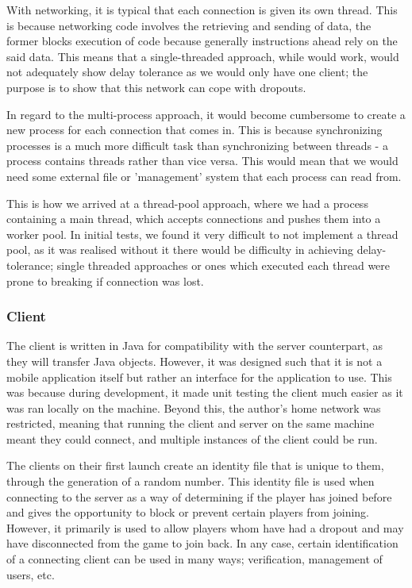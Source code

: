 \documentclass[11pt]{article}
\begin{document}
With networking, it is typical that each connection is given its own thread. This is because networking code involves the retrieving and sending of data, the former blocks execution of code because generally instructions ahead rely on the said data. This means that a single-threaded approach, while would work, would not adequately show delay tolerance as we would only have one client; the purpose is to show that this network can cope with dropouts.

In regard to the multi-process approach, it would become cumbersome to create a new process for each connection that comes in. This is because synchronizing processes is a much more difficult task than synchronizing between threads - a process contains threads rather than vice versa. This would mean that we would need some external file or 'management' system that each process can read from. 


This is how we arrived at a thread-pool approach, where we had a process containing a main thread, which accepts connections and pushes them into a worker pool. In initial tests, we found it very difficult to not implement a thread pool, as it was realised without it there would be difficulty in achieving delay-tolerance; single threaded approaches or ones which executed each thread were prone to breaking if connection was lost. 






\subsubsection{Client}

The client is written in Java for compatibility with the server counterpart, as they will transfer Java objects. However, it was designed such that it is not a mobile application itself but rather an interface for the application to use. This was because during development, it made unit testing the client much easier as it was ran locally on the machine. Beyond this, the author's home network was restricted, meaning that running the client and server on the same machine meant they could connect, and multiple instances of the client could be run. 

The clients on their first launch create an identity file that is unique to them, through the generation of a random number. This identity file is used when connecting to the server as a way of determining if the player has joined before and gives the opportunity to block or prevent certain players from joining. However, it primarily is used to allow players whom have had a dropout and may have disconnected from the game to join back. In any case, certain identification of a connecting client can be used in many ways; verification, management of users, etc.
\end{document}
